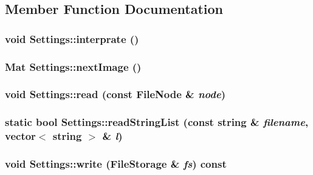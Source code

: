 \subsection{Member Function Documentation}
\hypertarget{classSettings_ac01c17bf3536e296f1076e50cdcb00cd}{
\subsubsection[{interprate}]{\setlength{\rightskip}{0pt plus 5cm}void Settings::interprate ()}}
\label{classSettings_ac01c17bf3536e296f1076e50cdcb00cd}
\hypertarget{classSettings_a7701462e928f2425b342440fba9973e5}{
\subsubsection[{nextImage}]{\setlength{\rightskip}{0pt plus 5cm}Mat Settings::nextImage ()}}
\label{classSettings_a7701462e928f2425b342440fba9973e5}
\hypertarget{classSettings_a2d7841f8441095032e0f3b7d20adfd3f}{
\subsubsection[{read}]{\setlength{\rightskip}{0pt plus 5cm}void Settings::read (const FileNode \& {\em node})}}
\label{classSettings_a2d7841f8441095032e0f3b7d20adfd3f}
\hypertarget{classSettings_ae57696cead99c4f0c528e33793866457}{
\subsubsection[{readStringList}]{\setlength{\rightskip}{0pt plus 5cm}static bool Settings::readStringList (const string \& {\em filename}, \/  vector$<$ string $>$ \& {\em l})}}
\label{classSettings_ae57696cead99c4f0c528e33793866457}
\hypertarget{classSettings_ae320e2f94798ba2de400f73a8110d412}{
\subsubsection[{write}]{\setlength{\rightskip}{0pt plus 5cm}void Settings::write (FileStorage \& {\em fs}) const}}
\label{classSettings_ae320e2f94798ba2de400f73a8110d412}


